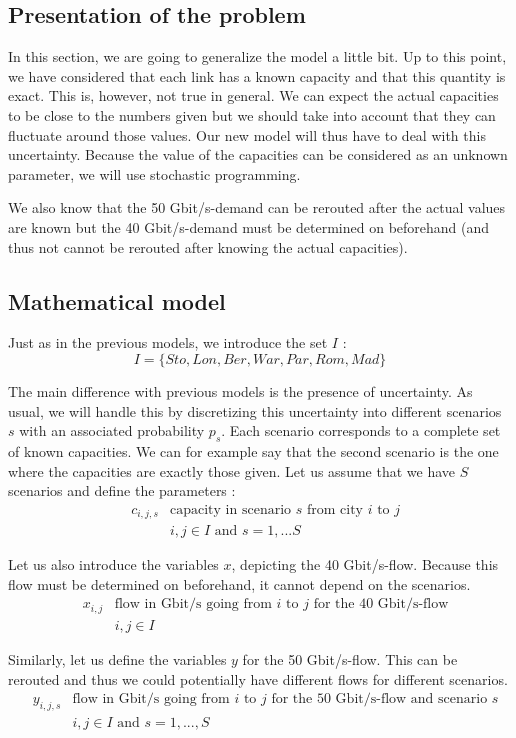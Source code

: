 \subsection{Presentation of the problem}
In this section, we are going to generalize the model a little bit. Up to this point, we have considered that each link has a known capacity and that this quantity is exact. This is, however, not true in general. We can expect the actual capacities to be close to the numbers given but we should take into account that they can fluctuate around those values. Our new model will thus have to deal with this uncertainty. Because the value of the capacities can be considered as an unknown parameter, we will use stochastic programming.

We also know that the 50 Gbit/s-demand can be rerouted after the actual values are known but the 40 Gbit/s-demand must be determined on beforehand (and thus not cannot be rerouted after knowing the actual capacities).

\subsection{Mathematical model}
Just as in the previous models, we introduce the set $I$ :
$$I = \{ Sto,Lon,Ber,War,Par,Rom,Mad\}$$

The main difference with previous models is the presence of uncertainty. As usual, we will handle this by discretizing this uncertainty into different scenarios $s$ with an associated probability $p_s$. Each scenario corresponds to a complete set of known capacities. We can for example say that the second scenario is the one where the capacities are exactly those given. Let us assume that we have $S$ scenarios and define the parameters : 
\begin{align*}
&c_{i,j,s} &\text{capacity in scenario $s$ from city $i$ to $j$} \\
& &i,j \in I \text{ and } s=1,...S
\end{align*}

Let us also introduce the variables $x$, depicting the 40 Gbit/s-flow. Because this flow must be determined on beforehand, it cannot depend on the scenarios.
\begin{align*}
&x_{i,j} &\text{flow in Gbit/s going from $i$ to $j$ for the 40 Gbit/s-flow}\\
& &i,j \in I
\end{align*}

Similarly, let us define the variables $y$ for the 50 Gbit/s-flow. This can be rerouted and thus we could potentially have different flows for different scenarios.
\begin{align*}
&y_{i,j,s} &\text{flow in Gbit/s going from $i$ to $j$ for the 50 Gbit/s-flow and scenario $s$}\\
& &i,j \in I \text{ and } s=1,...,S
\end{align*}



 